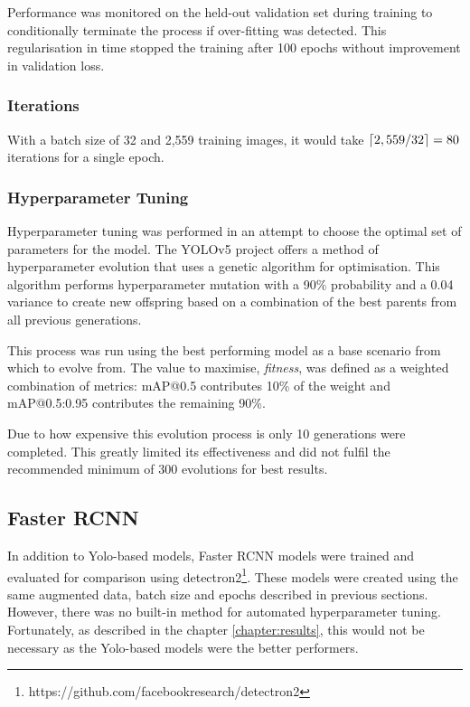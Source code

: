 \documentclass{thesis}
\begin{document}
Performance was monitored on the held-out validation set during training to conditionally terminate the process if over-fitting was detected. This regularisation in time stopped the training after 100 epochs without improvement in validation loss.

\subsubsection{Iterations} 

With a batch size of 32 and 2,559 training images, it would take $\lceil2,559 / 32\rceil = 80$ iterations for a single epoch.

\subsubsection{Hyperparameter Tuning}

Hyperparameter tuning was performed in an attempt to choose the optimal set of parameters for the model. The YOLOv5 project offers a method of hyperparameter evolution that uses a genetic algorithm for optimisation. This algorithm performs hyperparameter mutation with a 90\% probability and a 0.04 variance to create new offspring based on a combination of the best parents from all previous generations.

This process was run using the best performing model as a base scenario from which to evolve from. The value to maximise, \textit{fitness}, was defined as a weighted combination of metrics: mAP@0.5 contributes 10\% of the weight and mAP@0.5:0.95 contributes the remaining 90\%. 

Due to how expensive this evolution process is only 10 generations were completed. This greatly limited its effectiveness and did not fulfil the recommended minimum of 300 evolutions for best results\cite{yolov5-hyperparam}.

\subsection{Faster RCNN}

In addition to Yolo-based models, Faster RCNN models were trained and evaluated for comparison using detectron2\footnote{https://github.com/facebookresearch/detectron2}. These models were created using the same augmented data, batch size and epochs described in previous sections. However, there was no built-in method for automated hyperparameter tuning. Fortunately, as described in the chapter \ref{chapter:results}, this would not be necessary as the Yolo-based models were the better performers.
\end{document}
